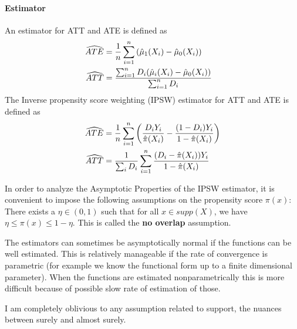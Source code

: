 \paragraph{Estimator} An estimator for ATT and ATE is defined as
\begin{align}
    \widehat{ATE} & = \frac{1}{n}\sum_{i=1}^n \left(\hat{\mu}_1(X_i)-\hat{\mu}_0(X_i)\right)              \\
    \widehat{ATT} & =\frac{\sum_{i=1}^n D_i(\hat{\mu}_i(X_i)-\hat{\mu}_0(X_i))}{\sum_{i=1}^n D_i}
                  &
\end{align}
The Inverse propensity score weighting (IPSW) estimator for ATT and ATE is defined as
\begin{align}
    \widehat{ATE} & = \frac{1}{n}\sum_{i=1}^n \left(\frac{D_iY_i}{\hat{\pi}(X_i)}-\frac{(1-D_i)Y_i}{1-\hat{\pi}(X_i)}\right) \\
    \widehat{ATT} & =\frac{1}{\sum_i D_i}\sum_{i=1}^n \frac{(D_i-\hat{\pi}(X_i))Y_i}{1-\hat{\pi}(X_i)}
\end{align}

In order to analyze the Asymptotic Properties of the IPSW estimator, it is
convenient to impose the following assumptions on the propensity score
$\pi(x)$: There exists a $\eta\in (0,1)$ such that for all $x\in supp(X)$, we
have $\eta\le \pi(x)\le 1-\eta$. This is called the \textbf{no overlap}
assumption.

The estimators can sometimes be asymptotically normal if the functions can be
well estimated. This is relatively manageable if the rate of convergence is
parametric (for example we know the functional form up to a finite dimensional
parameter). When the functions are estimated nonparametrically this is more
difficult because of possible slow rate of estimation of those.

    {\color{red} I am completely oblivious to any assumption related to support, the nuances between surely and almost surely.}
